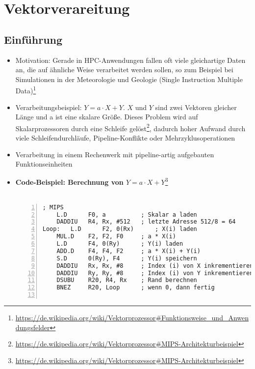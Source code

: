 \section{Vektorverareitung}

\subsection{Einführung}
\begin{itemize}
	\item Motivation: Gerade in HPC-Anwendungen fallen oft viele gleichartige Daten an, die auf ähnliche Weise verarbeitet werden sollen, so zum Beispiel bei Simulationen in der Meteorologie und Geologie (Single Instruction Multiple Data)\footnote{\url{https://de.wikipedia.org/wiki/Vektorprozessor\#Funktionsweise_und_Anwendungsfelder}}
	\item Verarbeitungsbeispiel: \(Y = a \cdot X + Y\). \(X\) und \(Y\) sind zwei Vektoren gleicher Länge und a ist eine skalare Größe. Dieses Problem wird auf Skalarprozessoren durch eine Schleife gelöst\footnote{\url{https://de.wikipedia.org/wiki/Vektorprozessor\#MIPS-Architekturbeispiel}}, dadurch hoher Aufwand durch viele Schleifendurchläufe, Pipeline-Konflikte oder Mehrzyklusoperationen
	\item Verarbeitung in einem Rechenwerk mit pipeline-artig aufgebauten Funktionseinheiten
	\item \textbf{Code-Beispiel: Berechnung von \(Y = a \cdot X + Y\)}\footnote{\url{https://de.wikipedia.org/wiki/Vektorprozessor\#MIPS-Architekturbeispiel}}\\\\
	\begin{minipage}{\linewidth}
	\begin{lstlisting}[frame=single,numbers=left,mathescape,language={[mips]Assembler}]
; MIPS
	L.D 	 F0, a          ; Skalar a laden
	DADDIU	 R4, Rx, #512   ; letzte Adresse 512/8 = 64
Loop:	L.D 	 F2, 0(Rx)  	; X(i) laden
	MUL.D    F2, F2, F0     ; a * X(i)
	L.D      F4, 0(Ry)      ; Y(i) laden
	ADD.D    F4, F4, F2     ; a * X(i) + Y(i)
	S.D      0(Ry), F4      ; Y(i) speichern
	DADDIU   Rx, Rx, #8     ; Index (i) von X inkrementieren
	DADDIU   Ry, Ry, #8     ; Index (i) von Y inkrementieren
	DSUBU    R20, R4, Rx    ; Rand berechnen
	BNEZ     R20, Loop      ; wenn 0, dann fertig


\end{lstlisting}
\end{minipage}
\end{itemize}
